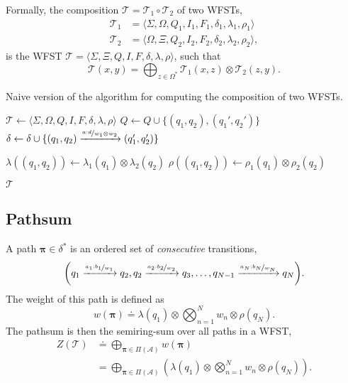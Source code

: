 \begin{definition}
  Formally, the composition $\mathcal{T}=\mathcal{T}_1 \circ \mathcal{T}_2$
  of two WFSTs,
  \begin{align*}
    \mathcal{T}_1 &= \langle \Sigma,\Omega,Q_1,I_1,F_1,\delta_1,\lambda_1,\rho_1 \rangle \\
    \mathcal{T}_2 &= \langle \Omega,\Xi,Q_2,I_2,F_2,\delta_2,\lambda_2,\rho_2 \rangle
  ,\end{align*}
  is the WFST $\mathcal{T}=\langle
  \Sigma,\Xi,Q,I,F,\delta,\lambda,\rho \rangle$, such that \[
    \mathcal{T}(x,y) = \bigoplus_{z\in\Omega^*} \mathcal{T}_1(x,z) \otimes \mathcal{T}_2(z,y)
  .\]
\end{definition}

\begin{algorithm}
  \caption{Naive version of the algorithm for computing the composition of
  two WFSTs.}
  \label{fig:naive-composition}

  \begin{algorithmic}[1]
      \State $\mathcal{T} \gets \langle \Sigma,\Omega,Q,I,F,\delta,\lambda,\rho \rangle$ 
            \State $Q \gets Q \cup \{(q_1,q_2),(q_1',q_2')\}$ 
            \State $\delta \gets \delta \cup \{ (q_1,q_2) \xrightarrow{\nicefrac{a:d}{w_1\otimes w_2}} (q_1',q_2') \}$ 
          \EndIf
        \EndFor
      \EndFor

       
        \State $\lambda((q_1,q_2)) \gets \lambda_1(q_1) \otimes \lambda_2(q_2)$
        \State $\rho((q_1,q_2)) \gets \rho_1(q_1) \otimes \rho_2(q_2)$
      \EndFor

      \State \Return $\mathcal{T}$
    \EndFunction
  \end{algorithmic}
\end{algorithm}

\subsection{Pathsum}

A path $\bm{\pi}\in\delta^*$ is an ordered set of \emph{consecutive}
transitions, \[
  \lft( q_1 \xrightarrow{\nicefrac{a_1:b_1}{w_1}} q_2, q_2 \xrightarrow{\nicefrac{a_2:b_2}{w_2}} q_3,\ldots, q_{N-1} \xrightarrow{\nicefrac{a_N:b_N}{w_N}} q_N \rgt)
.\]
The weight of this path is defined as \[
  w(\bm{\pi}) \doteq \lambda(q_1) \otimes \bigotimes_{n=1}^N w_n \otimes \rho(q_N)
.\]
The pathsum is then the semiring-sum over all paths in a WFST,
\begin{align*}
  Z(\mathcal{T}) &\doteq \bigoplus_{\bm{\pi}\in\Pi(\mathcal{A})} w(\bm{\pi}) \\
  &= \bigoplus_{\bm{\pi}\in\Pi(\mathcal{A})} \left( \lambda(q_1) \otimes \bigotimes_{n=1}^N w_n \otimes \rho(q_N) \right)
.\end{align*}

